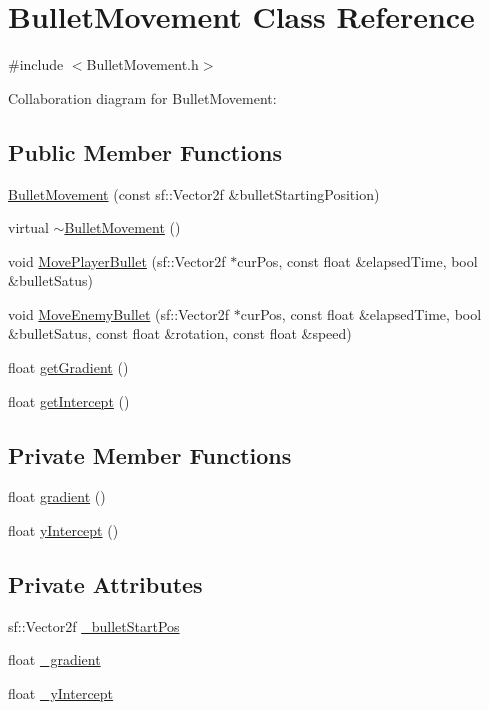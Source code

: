 \hypertarget{class_bullet_movement}{}\section{Bullet\+Movement Class Reference}
\label{class_bullet_movement}


{\ttfamily \#include $<$Bullet\+Movement.\+h$>$}



Collaboration diagram for Bullet\+Movement\+:
\subsection*{Public Member Functions}
\begin{DoxyCompactItemize}
\item 
\hyperlink{class_bullet_movement_a828d99972323657caf3dafa00e3a9e5e}{Bullet\+Movement} (const sf\+::\+Vector2f \&bullet\+Starting\+Position)
\item 
virtual \hyperlink{class_bullet_movement_a81e3816f8089dd796ed1ac03a3d9c683}{$\sim$\+Bullet\+Movement} ()
\item 
void \hyperlink{class_bullet_movement_a33b6ad498331352d366e2dab6bc2c712}{Move\+Player\+Bullet} (sf\+::\+Vector2f $\ast$cur\+Pos, const float \&elapsed\+Time, bool \&bullet\+Satus)
\item 
void \hyperlink{class_bullet_movement_ae7109a6098374d23e8dc2360d6546b7c}{Move\+Enemy\+Bullet} (sf\+::\+Vector2f $\ast$cur\+Pos, const float \&elapsed\+Time, bool \&bullet\+Satus, const float \&rotation, const float \&speed)
\item 
float \hyperlink{class_bullet_movement_a4dddd135a0d89dbb8d7b4ec076264f16}{get\+Gradient} ()
\item 
float \hyperlink{class_bullet_movement_ab9716be6fffd1b7f58e5b3be24062e5b}{get\+Intercept} ()
\end{DoxyCompactItemize}
\subsection*{Private Member Functions}
\begin{DoxyCompactItemize}
\item 
float \hyperlink{class_bullet_movement_a84efe87d137c1d0b9e14de5a5c9c7938}{gradient} ()
\item 
float \hyperlink{class_bullet_movement_a165576c782ea8432c14ee86456ff97c4}{y\+Intercept} ()
\end{DoxyCompactItemize}
\subsection*{Private Attributes}
\begin{DoxyCompactItemize}
\item 
sf\+::\+Vector2f \hyperlink{class_bullet_movement_a80f3b6b7f248b1bfecc4845319bc91fc}{\+\_\+bullet\+Start\+Pos}
\item 
float \hyperlink{class_bullet_movement_a21abb8a9b6d5d1d6cd5e079648ade529}{\+\_\+gradient}
\item 
float \hyperlink{class_bullet_movement_a8d20043e5da44b2585b78e0be9d9ad66}{\+\_\+y\+Intercept}
\end{DoxyCompactItemize}


